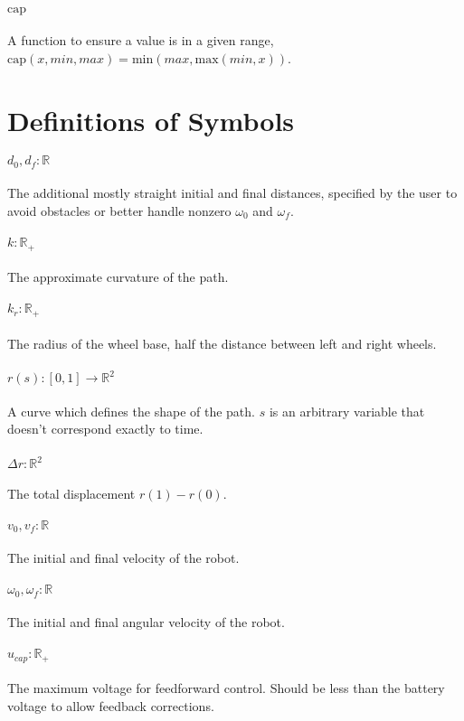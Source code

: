 \documentclass{article}
\begin{document}
\paragraph{$\mathrm{cap}$} A function to ensure a value is in a given range,
$\mathrm{cap}(x, min, max) = \mathrm{min}(max, \mathrm{max}(min, x))$.

\section{Definitions of Symbols}
\paragraph{$d_0, d_f: \mathbb{R}$} The additional mostly straight initial and final distances,
specified by the user to avoid obstacles or better handle nonzero $\omega_0$ and $\omega_f$.
\paragraph{$k: \mathbb{R}_+$} The approximate curvature of the path.
\paragraph{$k_r: \mathbb{R}_+$} The radius of the wheel base, half the distance between left and right wheels.
\paragraph{$r(s): [0,1] \rightarrow \mathbb{R}^2$} A curve which defines the shape of the path.
$s$ is an arbitrary variable that doesn't correspond exactly to time.
\paragraph{$\Delta r: \mathbb{R}^2$} The total displacement $r(1)-r(0)$.
\paragraph{$v_0, v_f: \mathbb{R}$} The initial and final velocity of the robot.
\paragraph{$\omega_0, \omega_f: \mathbb{R}$} The initial and final angular velocity of the robot.
\paragraph{$u_{cap}: \mathbb{R}_+$} The maximum voltage for feedforward control.
Should be less than the battery voltage to allow feedback corrections.
\end{document}
